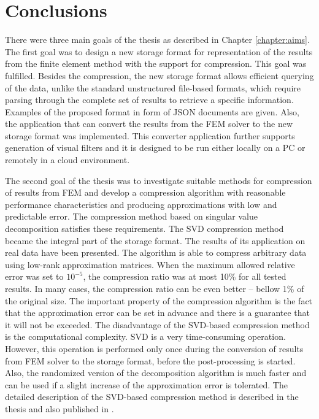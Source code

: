 \chapter{Conclusions}

There were three main goals of the thesis as described in Chapter \ref{chapter:aims}. The first goal was to design a new storage format for representation of the results from the finite element method with the support for compression. This goal was fulfilled. Besides the compression, the new storage format allows efficient querying of the data, unlike the standard unstructured file-based formats, which require parsing through the complete set of results to retrieve a specific information. Examples of the proposed format in form of JSON documents are given. Also, the application that can convert the results from the FEM solver to the new storage format was implemented. This converter application further supports generation of visual filters and it is designed to be run either locally on a PC or remotely in a cloud environment.

The second goal of the thesis was to investigate suitable methods for compression of results from FEM and develop a compression algorithm with reasonable performance characteristics and producing approximations with low and predictable error. The compression method based on singular value decomposition satisfies these requirements. The SVD compression method became the integral part of the storage format. The results of its application on real data have been presented. The algorithm is able to compress arbitrary data using low-rank approximation matrices. When the maximum allowed relative error was set to $10^{-5}$, the compression ratio was at most 10\% for all tested results. In many cases, the compression ratio can be even better -- bellow 1\% of the original size. The important property of the compression algorithm is the fact that the approximation error can be set in advance and there is a guarantee that it will not be exceeded. The disadvantage of the SVD-based compression method is the computational complexity. SVD is a very time-consuming operation. However, this operation is performed only once during the conversion of results from FEM solver to the storage format, before the post-processing is started. Also, the randomized version of the decomposition algorithm is much faster and can be used if a slight increase of the approximation error is tolerated. The detailed description of the SVD-based compression method is described in the thesis and also published in \cite{Benes2018}.

